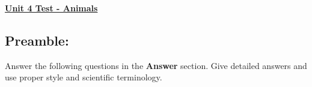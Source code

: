 \documentclass[12pt]{article} %
\begin{document}
	\renewcommand*{\coursecode}{MATH 235} %
	\renewcommand*{\assgnnumber}{Assignment 1} %
	\renewcommand*{\submdate}{September 14, 2021} %
	\renewcommand*{\studentfname}{Abdullah} %
	\renewcommand*{\studentlname}{Zubair} %
    \renewcommand*{\proofname}{Proof:}

	\renewcommand\qedsymbol{$\blacksquare$}
	\setfigpath
	\fancyhfoffset[L,O]{0pt} %




\begin{center}
	\textbf{\underline{\Huge{Unit 4 Test - Animals}}}
\end{center}

\subsection*{Preamble:}
Answer the following questions in the \textbf{Answer} section. Give detailed answers and use proper style and scientific terminology.
\end{document}
